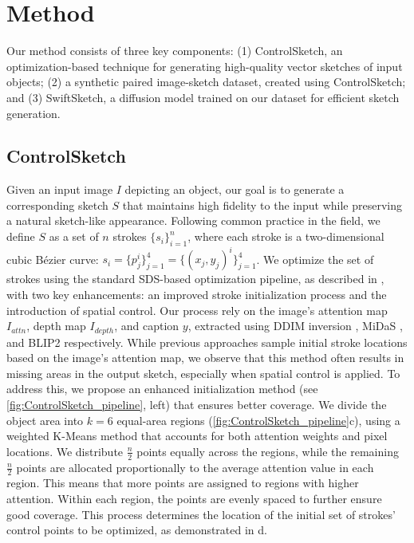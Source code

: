 









\section{Method}
Our method consists of three key components: (1) ControlSketch, an optimization-based technique for generating high-quality vector sketches of input objects; (2) a synthetic paired image-sketch dataset, created using ControlSketch; and (3) SwiftSketch, a diffusion model trained on our dataset for efficient sketch generation.



\subsection{ControlSketch}
\label{sec:controlsketch}
Given an input image $I$ depicting an object, our goal is to generate a corresponding sketch $S$ that maintains high fidelity to the input while preserving a natural sketch-like appearance. Following common practice in the field, we define $S$ as a set of $n$ strokes $\{s_i\}_{i=1}^n$, where each stroke is a two-dimensional cubic Bézier curve: $s_i = \{p_j^i\}_{j=1}^4 = \{(x_j, y_j)^i\}_{j=1}^4$. 
We optimize the set of strokes using the standard SDS-based optimization pipeline, as described in , with two key enhancements: an improved stroke initialization process and the introduction of spatial control. Our process rely on the image's attention map $I_{attn}$, depth map $I_{depth}$, and caption $y$, extracted using DDIM inversion \cite{song2021ddim}, MiDaS \cite{birkl2023midasv31model}, and BLIP2 \cite{li2023blip2bootstrappinglanguageimagepretraining} respectively.
While previous approaches \cite{vinker2022clipasso,Xing2023DiffSketcherTG} sample initial stroke locations based on the image's attention map, we observe that this method often results in missing areas in the output sketch, especially when spatial control is applied. To address this, we propose an enhanced initialization method (see \cref{fig:ControlSketch_pipeline}, left) that ensures better coverage. We divide the object area into $k=6$ equal-area regions (\cref{fig:ControlSketch_pipeline}c), using a weighted K-Means method that accounts for both attention weights and pixel locations. We distribute $\frac{n}{2}$ points equally across the regions, while the remaining $\frac{n}{2}$ points are allocated proportionally to the average attention value in each region. This means that more points are assigned to regions with higher attention. Within each region, the points are evenly spaced to further ensure good coverage.
This process determines the location of the initial set of strokes' control points to be optimized, as demonstrated in d.

